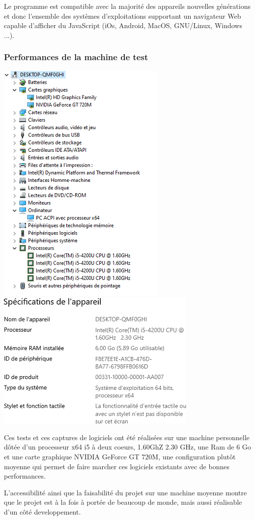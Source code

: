 Le programme est compatible avec la majorité des appareils nouvelles générations et donc l'ensemble des systèmes d'exploitations supportant un navigateur Web capable d'afficher du JavaScript (iOs, Android,
MacOS, GNU/Linux, Windows ...).

\subsubsection{Performances de la machine de test}

\begin{center}
  \includegraphics[height = 7 cm]{images/figure9.png}
  \includegraphics[height = 7 cm]{images/figure10.png}\\
\end{center}

Ces tests et ces captures de logiciels ont été réalisées sur une machine personnelle dôtée d'un processeur x64 i5 à deux coeurs, 1.60GhZ 2.30 GHz, une Ram de 6 Go et une carte graphique NVIDIA GeForce GT 720M, une configuration plutôt moyenne qui permet de faire marcher ces logiciels existants avec de bonnes performances.

L'accessibilité ainsi que la faisabilité du projet sur une machine moyenne montre que le projet est à la fois à portée de beaucoup de monde, mais aussi réalisable d'un côté developpement.
